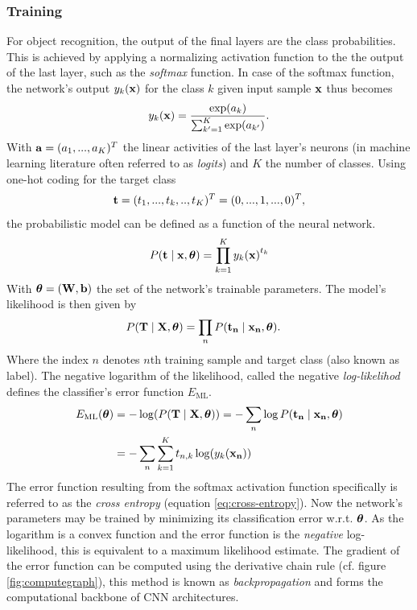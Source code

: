 \subsubsection{Training}
For object recognition, the output of the final layers are the class probabilities. This is achieved by applying a normalizing activation function to the the output of the last layer, such as the \emph{softmax} function. In case of the softmax function, the network's output $y_k\qty(\vb{x})$ for the class $k$ given input sample $\vb{x}$ thus becomes
\begin{align}
    y_k\qty(\vb{x}) = \frac{\exp(a_k)}{\sum_{k'=1}^K \exp(a_{k'})}.
\end{align}
With $\vb{a}=(a_1,...,a_K)^T$ the linear activities of the last layer's neurons (in machine learning literature often referred to as \emph{logits}) and $K$ the number of classes. Using one-hot coding for the target class
\begin{align}
    \vb{t} = (t_1,...,t_k,..,t_K)^T = (0,...,1,...,0)^T,
\end{align}
the probabilistic model can be defined as a function of the neural network.
\begin{align}
    P\qty(\vb{t}\mid \vb{x},\vb*{\theta}) = \prod_{k=1}^K y_k\qty(\vb{x})^{t_k}
\end{align}
With $\vb*{\theta}=(\vb{W}, \vb{b})$ the set of the network's trainable parameters. The model's likelihood is then given by
\begin{align}
    P\qty(\vb{T}\mid \vb{X}, \vb*{\theta}) &= \prod_n P(\vb{t_n}\mid\vb{x_n},\vb*{\theta}).
\end{align}
Where the index $n$ denotes $n$th training sample and target class (also known as label). The negative logarithm of the likelihood, called the negative \emph{log-likelihod} defines the classifier's error function $E_{\mathrm{ML}}$.
\begin{align}
    E_{\mathrm{ML}}\qty(\vb*{\theta}) &= -\log(P\qty(\vb{T}\mid \vb{X}, \vb*{\theta})) = -\sum_n \log P(\vb{t_n}\mid\vb{x_n},\vb*{\theta}) \\ &= -\sum_n \sum_{k=1}^K t_{n,k}\log(y_{k}\qty(\vb{x_n})) \label{eq:cross-entropy}
\end{align}
The error function resulting from the softmax activation function specifically is referred to as the \emph{cross entropy} (equation \ref{eq:cross-entropy}). Now the network's parameters may be trained by minimizing its classification error w.r.t. $\vb*{\theta}$. As the logarithm is a convex function and the error function is the \emph{negative} log-likelihood, this is equivalent to a maximum likelihood estimate. The gradient of the error function can be computed using the derivative chain rule (cf. figure \ref{fig:computegraph}), this method is known as \emph{backpropagation} and forms the computational backbone of CNN architectures.
